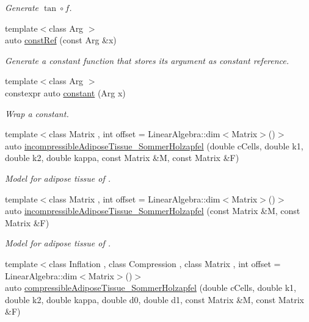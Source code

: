 \begin{DoxyCompactItemize}
\begin{DoxyCompactList}\small\item\em Generate $ \tan\circ f $. \end{DoxyCompactList}\item 
{\footnotesize template$<$class Arg $>$ }\\auto \hyperlink{namespaceFunG_abcfb38c2e995436816ea884803302f2d}{const\-Ref} (const Arg \&x)
\begin{DoxyCompactList}\small\item\em Generate a constant function that stores its argument as constant reference. \end{DoxyCompactList}\item 
{\footnotesize template$<$class Arg $>$ }\\constexpr auto \hyperlink{namespaceFunG_a939d13d36c194b402715f12a28147cdc}{constant} (Arg x)
\begin{DoxyCompactList}\small\item\em Wrap a constant. \end{DoxyCompactList}\item 
{\footnotesize template$<$class Matrix , int offset = Linear\-Algebra\-::dim$<$\-Matrix$>$()$>$ }\\auto \hyperlink{group__Biomechanics_gac269eefc1abb994044e1634c20a98061}{incompressible\-Adipose\-Tissue\-\_\-\-Sommer\-Holzapfel} (double c\-Cells, double k1, double k2, double kappa, const Matrix \&M, const Matrix \&F)
\begin{DoxyCompactList}\small\item\em Model for adipose tissue of \cite{Sommer2013}. \end{DoxyCompactList}\item 
{\footnotesize template$<$class Matrix , int offset = Linear\-Algebra\-::dim$<$\-Matrix$>$()$>$ }\\auto \hyperlink{group__Biomechanics_ga01ab128bcf179f4431b0270179af9e20}{incompressible\-Adipose\-Tissue\-\_\-\-Sommer\-Holzapfel} (const Matrix \&M, const Matrix \&F)
\begin{DoxyCompactList}\small\item\em Model for adipose tissue of \cite{Sommer2013}. \end{DoxyCompactList}\item 
{\footnotesize template$<$class Inflation , class Compression , class Matrix , int offset = Linear\-Algebra\-::dim$<$\-Matrix$>$()$>$ }\\auto \hyperlink{group__Biomechanics_ga5c3388564c0420b62e58f48c739d27f1}{compressible\-Adipose\-Tissue\-\_\-\-Sommer\-Holzapfel} (double c\-Cells, double k1, double k2, double kappa, double d0, double d1, const Matrix \&M, const Matrix \&F)

\end{DoxyCompactItemize}
